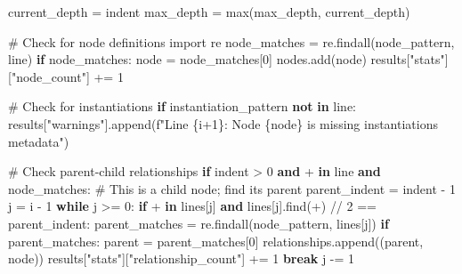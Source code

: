 \documentclass[
  11pt,
  letterpaper,
]{book}
\newenvironment{Shaded}{\begin{snugshade}}{\end{snugshade}}
\newcommand{\BuiltInTok}[1]{\textcolor[rgb]{0.00,0.23,0.31}{#1}}
\newcommand{\CommentTok}[1]{\textcolor[rgb]{0.37,0.37,0.37}{#1}}
\newcommand{\ControlFlowTok}[1]{\textcolor[rgb]{0.00,0.23,0.31}{\textbf{#1}}}
\newcommand{\DecValTok}[1]{\textcolor[rgb]{0.68,0.00,0.00}{#1}}
\newcommand{\ImportTok}[1]{\textcolor[rgb]{0.00,0.46,0.62}{#1}}
\newcommand{\KeywordTok}[1]{\textcolor[rgb]{0.00,0.23,0.31}{\textbf{#1}}}
\newcommand{\NormalTok}[1]{\textcolor[rgb]{0.00,0.23,0.31}{#1}}
\newcommand{\OperatorTok}[1]{\textcolor[rgb]{0.37,0.37,0.37}{#1}}
\newcommand{\SpecialCharTok}[1]{\textcolor[rgb]{0.37,0.37,0.37}{#1}}
\newcommand{\SpecialStringTok}[1]{\textcolor[rgb]{0.13,0.47,0.30}{#1}}
\newcommand{\StringTok}[1]{\textcolor[rgb]{0.13,0.47,0.30}{#1}}
\begin{document}
\begin{Shaded}
\begin{Highlighting}[]
\NormalTok{        current\_depth }\OperatorTok{=}\NormalTok{ indent}
\NormalTok{        max\_depth }\OperatorTok{=} \BuiltInTok{max}\NormalTok{(max\_depth, current\_depth)}

        \CommentTok{\# Check for node definitions}
        \ImportTok{import}\NormalTok{ re}
\NormalTok{        node\_matches }\OperatorTok{=}\NormalTok{ re.findall(node\_pattern, line)}
        \ControlFlowTok{if}\NormalTok{ node\_matches:}
\NormalTok{            node }\OperatorTok{=}\NormalTok{ node\_matches[}\DecValTok{0}\NormalTok{]}
\NormalTok{            nodes.add(node)}
\NormalTok{            results[}\StringTok{"stats"}\NormalTok{][}\StringTok{"node\_count"}\NormalTok{] }\OperatorTok{+=} \DecValTok{1}

            \CommentTok{\# Check for instantiations}
            \ControlFlowTok{if}\NormalTok{ instantiation\_pattern }\KeywordTok{not} \KeywordTok{in}\NormalTok{ line:}
\NormalTok{                results[}\StringTok{"warnings"}\NormalTok{].append(}\SpecialStringTok{f"Line }\SpecialCharTok{\{}\NormalTok{i}\OperatorTok{+}\DecValTok{1}\SpecialCharTok{\}}\SpecialStringTok{: Node \textquotesingle{}}\SpecialCharTok{\{}\NormalTok{node}\SpecialCharTok{\}}\SpecialStringTok{\textquotesingle{} is missing instantiations metadata"}\NormalTok{)}

        \CommentTok{\# Check parent{-}child relationships}
        \ControlFlowTok{if}\NormalTok{ indent }\OperatorTok{\textgreater{}} \DecValTok{0} \KeywordTok{and} \StringTok{\textquotesingle{}+\textquotesingle{}} \KeywordTok{in}\NormalTok{ line }\KeywordTok{and}\NormalTok{ node\_matches:}
            \CommentTok{\# This is a child node; find its parent}
\NormalTok{            parent\_indent }\OperatorTok{=}\NormalTok{ indent }\OperatorTok{{-}} \DecValTok{1}
\NormalTok{            j }\OperatorTok{=}\NormalTok{ i }\OperatorTok{{-}} \DecValTok{1}
            \ControlFlowTok{while}\NormalTok{ j }\OperatorTok{\textgreater{}=} \DecValTok{0}\NormalTok{:}
                \ControlFlowTok{if} \StringTok{\textquotesingle{}+\textquotesingle{}} \KeywordTok{in}\NormalTok{ lines[j] }\KeywordTok{and}\NormalTok{ lines[j].find(}\StringTok{\textquotesingle{}+\textquotesingle{}}\NormalTok{) }\OperatorTok{//} \DecValTok{2} \OperatorTok{==}\NormalTok{ parent\_indent:}
\NormalTok{                    parent\_matches }\OperatorTok{=}\NormalTok{ re.findall(node\_pattern, lines[j])}
                    \ControlFlowTok{if}\NormalTok{ parent\_matches:}
\NormalTok{                        parent }\OperatorTok{=}\NormalTok{ parent\_matches[}\DecValTok{0}\NormalTok{]}
\NormalTok{                        relationships.append((parent, node))}
\NormalTok{                        results[}\StringTok{"stats"}\NormalTok{][}\StringTok{"relationship\_count"}\NormalTok{] }\OperatorTok{+=} \DecValTok{1}
                        \ControlFlowTok{break}
\NormalTok{                j }\OperatorTok{{-}=} \DecValTok{1}


\end{Highlighting}
\end{Shaded}
\end{document}
